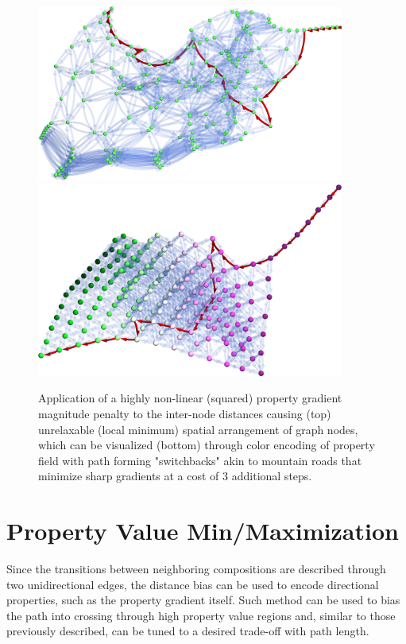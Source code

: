 \begin{figure}[H]
    \centering
    \includegraphics[width=0.9\textwidth]{pathplanning/InfeasibilityGliding_LowGradientSquared.png}
    \includegraphics[width=0.9\textwidth]{pathplanning/InfeasibilityGliding_LowGradientSquaredColored.png}
    \caption{Application of a highly non-linear (squared) property gradient magnitude penalty to the inter-node distances causing (top) unrelaxable (local minimum) spatial arrangement of graph nodes, which can be visualized (bottom) through color encoding of property field with path forming "switchbacks" akin to mountain roads that minimize sharp gradients at a cost of 3 additional steps.}
    \label{pathplan:fig:lowgradientsquared}
\end{figure}

\section{Property Value Min/Maximization} \label{pathplan:sec:minmax}

\todo

Since the transitions between neighboring compositions are described through two unidirectional edges, the distance bias can be used to encode directional properties, such as the property gradient itself. Such method can be used to bias the path into crossing through high property value regions and, similar to those previously described, can be tuned to a desired trade-off with path length.

